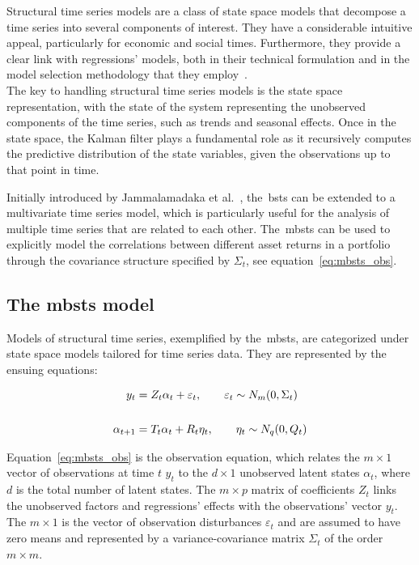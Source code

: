     Structural time series models are a class of state space models that decompose a time series into several components of interest.
    They have a considerable intuitive appeal, particularly for economic and social times.
    Furthermore, they provide a clear link with regressions' models, both in their technical formulation and in the model selection
    methodology that they employ~\cite{harvey_forecasting_1990}. \\

    The key to handling structural time series models is the state space representation, with the state of the system
    representing the unobserved components of the time series, such as trends and seasonal effects.
    Once in the state space, the Kalman filter plays a fundamental role as it recursively computes the predictive distribution
    of the state variables, given the observations up to that point in time.

    Initially introduced by Jammalamadaka et al.~\cite{qiu_multivariate_2018}, the~\gls{bsts} can be extended to a multivariate
    time series model, which is particularly useful for the analysis of multiple time series that are related to each other.
    The~\gls{mbsts} can be used to explicitly model the correlations between different asset returns in a portfolio through
    the covariance structure specified by $\Sigma_{t}$, see equation~\ref{eq:mbsts_obs}.

\subsection{The \gls{mbsts} model}
    \label{sec:mbsts}

    Models of structural time series, exemplified by the~\gls{mbsts},
    are categorized under state space models tailored for time series data. They are represented by the ensuing equations:

    \begin{align}
        y_{t} &= Z_{t} \alpha_{t} + \varepsilon_{t}, \qquad \varepsilon_{t} \sim N_{m}(0, \Sigma_{t})
        \label{eq:mbsts_obs}\\
        \notag \\
        \alpha_{t+1} &= T_{t} \alpha_{t} + R_{t} \eta_{t}, \qquad \eta_{t} \sim N_{q}(0, Q_{t})
        \label{eq:mbsts_trans}
    \end{align}


    Equation~\ref{eq:mbsts_obs} is the observation equation, which relates the $m \times 1$
    vector of observations at time $t$ $y_{t}$ to the $d \times 1$ unobserved latent states $\alpha_{t}$,
    where $d$ is the total number of latent states.
    The $m \times p$ matrix of coefficients $Z_{t}$ links the unobserved factors and regressions' effects
    with the observations' vector $y_{t}$.
    The $m \times 1$ is the vector of observation disturbances $\varepsilon_{t}$ and are assumed to have zero means and
    represented by a variance-covariance matrix $\Sigma_{t}$ of the order $m \times m$.\\

